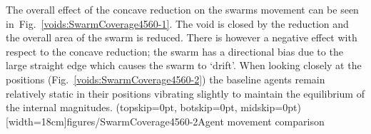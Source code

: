\documentclass{ieeeaccess}
\begin{document}
The overall effect of the concave reduction on the swarms movement can be seen in~Fig.~\ref{voids:SwarmCoverage4560-1}. The void is closed by the reduction and the overall area of the swarm is reduced. There is however a negative effect with respect to the concave reduction; the swarm has a directional bias due to the large straight edge which causes the swarm to `drift'. When looking closely at the positions (Fig.~\ref{voids:SwarmCoverage4560-2}) the baseline agents remain relatively static in their positions vibrating slightly to maintain the equilibrium of the internal magnitudes. 
\Figure[t!](topskip=0pt, botskip=0pt, midskip=0pt)[width=18cm]{figures/SwarmCoverage4560-2}{Agent movement comparison\label{voids:SwarmCoverage4560-2}}
\end{document}
